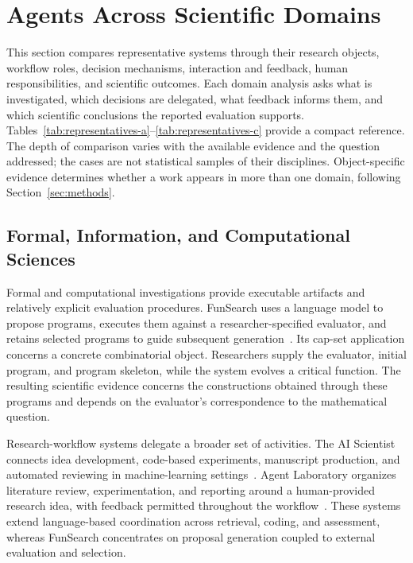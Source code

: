 \section{Agents Across Scientific Domains}
\label{sec:domains}

This section compares representative systems through their research objects, workflow roles, decision mechanisms, interaction and feedback, human responsibilities, and scientific outcomes. Each domain analysis asks what is investigated, which decisions are delegated, what feedback informs them, and which scientific conclusions the reported evaluation supports. Tables~\ref{tab:representatives-a}--\ref{tab:representatives-c} provide a compact reference. The depth of comparison varies with the available evidence and the question addressed; the cases are not statistical samples of their disciplines. Object-specific evidence determines whether a work appears in more than one domain, following Section~\ref{sec:methods}.

\subsection{Formal, Information, and Computational Sciences}

Formal and computational investigations provide executable artifacts and relatively explicit evaluation procedures. FunSearch uses a language model to propose programs, executes them against a researcher-specified evaluator, and retains selected programs to guide subsequent generation~\cite{asd0512}. Its cap-set application concerns a concrete combinatorial object. Researchers supply the evaluator, initial program, and program skeleton, while the system evolves a critical function. The resulting scientific evidence concerns the constructions obtained through these programs and depends on the evaluator's correspondence to the mathematical question.

Research-workflow systems delegate a broader set of activities. The AI Scientist connects idea development, code-based experiments, manuscript production, and automated reviewing in machine-learning settings~\cite{asd0069}. Agent Laboratory organizes literature review, experimentation, and reporting around a human-provided research idea, with feedback permitted throughout the workflow~\cite{asd0018}. These systems extend language-based coordination across retrieval, coding, and assessment, whereas FunSearch concentrates on proposal generation coupled to external evaluation and selection.

